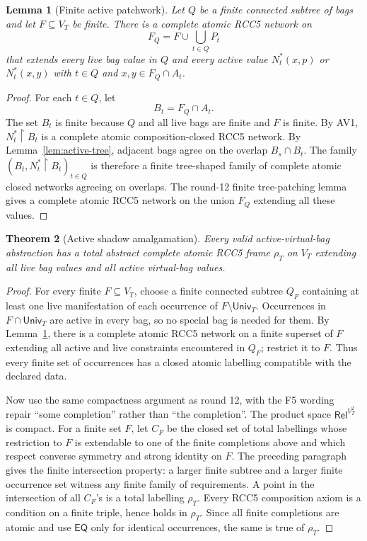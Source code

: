 \documentclass[11pt]{article}
\newtheorem{theorem}{Theorem}[section]
\newtheorem{lemma}[theorem]{Lemma}
\newcommand{\Rel}{\mathsf{Rel}}
\newcommand{\EQ}{\mathsf{EQ}}
\newcommand{\Univ}{\mathsf{Univ}}
\begin{document}
\begin{lemma}[Finite active patchwork]\label{lem:finite-active-patch}
Let \(Q\) be a finite connected subtree of bags and let \(F\subseteq V_T\) be
finite.  There is a complete atomic RCC5 network on
\[
  F_Q=F\cup\bigcup_{t\in Q}P_t
\]
that extends every live bag value in \(Q\) and every active value
\(N^*_t(x,p)\) or \(N^*_t(x,y)\) with \(t\in Q\) and
\(x,y\in F_Q\cap A_t\).
\end{lemma}

\begin{proof}
For each \(t\in Q\), let
\[
  B_t=F_Q\cap A_t.
\]
The set \(B_t\) is finite because \(Q\) and all live bags are finite and
\(F\) is finite.  By AV1, \(N^*_t\restriction B_t\) is a complete atomic
composition-closed RCC5 network.  By Lemma~\ref{lem:active-tree}, adjacent
bags agree on the overlap \(B_s\cap B_t\).  The family
\((B_t,N^*_t\restriction B_t)_{t\in Q}\) is therefore a finite tree-shaped
family of complete atomic closed networks agreeing on overlaps.  The round-12
finite tree-patching lemma gives a complete atomic RCC5 network on the union
\(F_Q\) extending all these values.
\end{proof}

\begin{theorem}[Active shadow amalgamation]\label{thm:active-amalgamation}
Every valid active-virtual-bag abstraction has a total abstract complete atomic
RCC5 frame \(\rho_T\) on \(V_T\) extending all live bag values and all active
virtual-bag values.
\end{theorem}

\begin{proof}
For every finite \(F\subseteq V_T\), choose a finite connected subtree \(Q_F\)
containing at least one live manifestation of each occurrence of
\(F\setminus\Univ_T\).  Occurrences in \(F\cap\Univ_T\) are active in every bag,
so no special bag is needed for them.  By Lemma~\ref{lem:finite-active-patch},
there is a complete atomic RCC5 network on a finite superset of \(F\) extending
all active and live constraints encountered in \(Q_F\); restrict it to \(F\).
Thus every finite set of occurrences has a closed atomic labelling compatible
with the declared data.

Now use the same compactness argument as round 12, with the F5 wording repair
``some completion'' rather than ``the completion''.  The product space
\(\Rel^{V_T^2}\) is compact.  For a finite set \(F\), let \(C_F\) be the closed
set of total labellings whose restriction to \(F\) is extendable to one of the
finite completions above and which respect converse symmetry and strong
identity on \(F\).  The preceding paragraph gives the finite intersection
property: a larger finite subtree and a larger finite occurrence set witness
any finite family of requirements.  A point in the intersection of all
\(C_F\)'s is a total labelling \(\rho_T\).  Every RCC5 composition axiom is a
condition on a finite triple, hence holds in \(\rho_T\).  Since all finite
completions are atomic and use \(\EQ\) only for identical occurrences, the same
is true of \(\rho_T\).
\end{proof}
\end{document}
